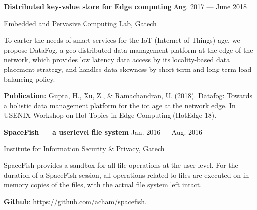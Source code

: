 \parbox[t][][t]{\linewidth}{
	\parbox{\linewidth}{\textbf{Distributed key-value store for Edge computing}
		\hfill {{Aug. 2017 --- June 2018}}}
		\smallbreak
	\parbox{\linewidth}{Embedded and Pervasive Computing Lab, Gatech}
	
	\bigskip
   To carter the needs of smart services for the IoT (Internet of Things) age, we propose DataFog, a geo-distributed data-management platform at the edge of the network, which provides low latency data access by its locality-based data placement strategy, and handles data skewness by short-term and long-term load balancing policy.

  \textbf{Publication:} Gupta, H., Xu, Z., \& Ramachandran, U. (2018). Datafog: Towards a holistic data management platform for the iot age at the network edge. In {USENIX} Workshop on Hot Topics in Edge Computing (HotEdge 18).
	\bigskip
}

\parbox[t][][t]{\linewidth}{
	\parbox{\linewidth}{\textbf{SpaceFish --- a userlevel file system}
		\hfill {{Jan. 2016 --- Aug. 2016}}}
		\smallbreak
	\parbox{\linewidth}{Institute for Information Security \& Privacy, Gatech}

	\bigskip

  SpaceFish provides a sandbox for all file operations at the user level. For the duration of a SpaceFish session, all operations related to files are executed on in-memory copies of the files, with the actual file system left intact.

  \textbf{Github}: \url{https://github.com/acham/spacefish}.
}






